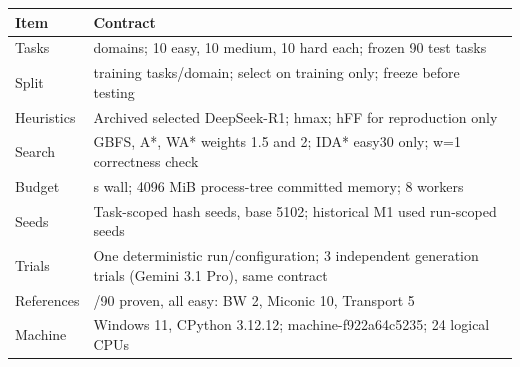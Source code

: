 \begingroup
\setlength{\tabcolsep}{2pt}
\begin{longtable}{>{\raggedright\arraybackslash}p{}>{\raggedright\arraybackslash}p{}}
\hline
Item & Contract \\ \hline\endhead
Tasks & 3 domains; 10 easy, 10 medium, 10 hard each; frozen 90 test tasks \\
Split & 99 training tasks/domain; select on training only; freeze before testing \\
Heuristics & Archived selected DeepSeek-R1; hmax; hFF for reproduction only \\
Search & GBFS, A*, WA* weights 1.5 and 2; IDA* easy30 only; w=1 correctness check \\
Budget & 60 s wall; 4096 MiB process-tree committed memory; 8 workers \\
Seeds & Task-scoped hash seeds, base 5102; historical M1 used run-scoped seeds \\
Trials & One deterministic run/configuration; 3 independent generation trials (Gemini 3.1 Pro), same contract \\
References & 17/90 proven, all easy: BW 2, Miconic 10, Transport 5 \\
Machine & Windows 11, CPython 3.12.12; machine-f922a64c5235; 24 logical CPUs \\
\hline
\end{longtable}
\endgroup
